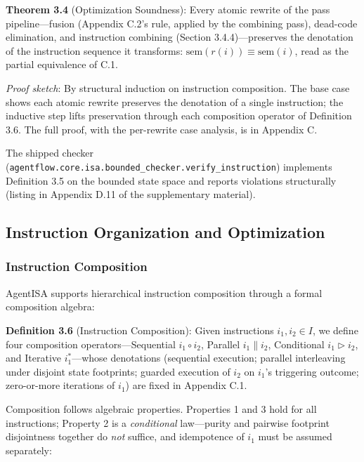 \documentclass[
  sigconf,
  anonymous]{acmart}
\begin{document}
\textbf{Theorem 3.4} (Optimization Soundness): Every atomic rewrite of
the pass pipeline---fusion (Appendix C.2's rule, applied by the
combining pass), dead-code elimination, and instruction combining
(Section 3.4.4)---preserves the denotation of the instruction sequence
it transforms: \(\text{sem}(r(i)) \equiv \text{sem}(i)\), read as the
partial equivalence of C.1.

\emph{Proof sketch}: By structural induction on instruction composition.
The base case shows each atomic rewrite preserves the denotation of a
single instruction; the inductive step lifts preservation through each
composition operator of Definition 3.6. The full proof, with the
per-rewrite case analysis, is in Appendix C.

The shipped checker
(\texttt{agentflow.core.isa.bounded\_checker.verify\_instruction})
implements Definition 3.5 on the bounded state space and reports
violations structurally (listing in Appendix D.11 of the supplementary
material).

\subsection{Instruction Organization and
Optimization}\label{instruction-organization-and-optimization}

\subsubsection{Instruction Composition}\label{instruction-composition}

AgentISA supports hierarchical instruction composition through a formal
composition algebra:

\textbf{Definition 3.6} (Instruction Composition): Given instructions
\(i_1, i_2 \in I\), we define four composition operators---Sequential
\(i_1 \circ i_2\), Parallel \(i_1 \parallel i_2\), Conditional
\(i_1 \triangleright i_2\), and Iterative \(i_1^*\)---whose denotations
(sequential execution; parallel interleaving under disjoint state
footprints; guarded execution of \(i_2\) on \(i_1\)'s triggering
outcome; zero-or-more iterations of \(i_1\)) are fixed in Appendix C.1.

Composition follows algebraic properties. Properties 1 and 3 hold for
all instructions; Property 2 is a \emph{conditional} law---purity and
pairwise footprint disjointness together do \emph{not} suffice, and
idempotence of \(i_1\) must be assumed separately:
\end{document}
